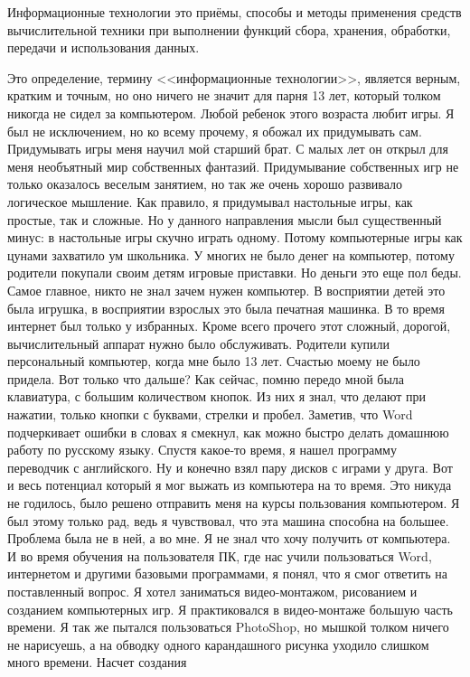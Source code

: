 Информационные технологии это приёмы, способы и методы применения средств вычислительной техники при выполнении
функций сбора, хранения, обработки, передачи и использования данных.

Это определение, термину <<информационные технологии>>, является верным, кратким и точным, но оно ничего не значит для парня
13 лет, который толком никогда не сидел за компьютером. Любой ребенок этого возраста любит игры. Я был не исключением, но
ко всему прочему, я обожал их придумывать сам. Придумывать игры меня научил мой старший брат. С малых лет он открыл для
меня необъятный мир собственных фантазий. Придумывание собственных игр не только оказалось веселым занятием, но так же
очень хорошо развивало логическое мышление. Как правило, я придумывал настольные игры, как простые, так и сложные. Но у
данного направления мысли был существенный минус: в настольные игры скучно играть одному. Потому компьютерные игры как
цунами захватило ум школьника. У многих не было денег на компьютер, потому родители покупали своим детям игровые приставки.
Но деньги это еще пол беды. Самое главное, никто не знал зачем нужен компьютер. В восприятии детей это была игрушка, в
восприятии взрослых это была печатная машинка. В то время интернет был только у избранных. Кроме всего прочего этот сложный,
дорогой, вычислительный аппарат нужно было обслуживать. Родители купили персональный компьютер, когда мне было 13 лет.
Счастью моему не было придела. Вот только что дальше? Как сейчас, помню передо мной была клавиатура, с большим количеством
кнопок. Из них я знал, что делают при нажатии, только кнопки с буквами, стрелки и пробел. Заметив, что Word подчеркивает
ошибки в словах я смекнул, как можно быстро делать домашнюю работу по русскому языку. Спустя какое-то время, я нашел
программу переводчик с английского. Ну и конечно взял пару дисков с играми у друга. Вот и весь потенциал который я мог
выжать из компьютера на то время. Это никуда не годилось, было решено отправить меня на курсы пользования компьютером. Я был
этому только рад, ведь я чувствовал, что эта машина способна на большее. Проблема была не в ней, а во мне. Я не знал что
хочу получить от компьютера. И во время обучения на пользователя ПК, где нас учили пользоваться Word, интернетом и другими
базовыми программами, я понял, что я смог ответить на поставленный вопрос. Я хотел заниматься видео-монтажом, рисованием и
созданием компьютерных игр. Я практиковался в видео-монтаже большую часть времени. Я так же пытался пользоваться PhotoShop,
но мышкой толком ничего не нарисуешь, а на обводку одного карандашного рисунка уходило слишком много времени. Насчет создания
